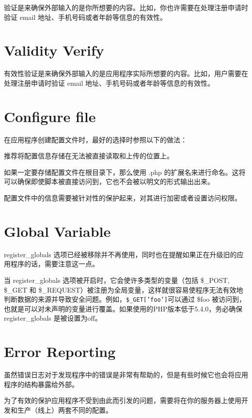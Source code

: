 验证是来确保外部输入的是你所想要的内容。比如，你也许需要在处理注册申请时验证 email 地址、手机号码或者年龄等信息的有效性。


\section{Validity Verify}


有效性验证是来确保外部输入的是应用程序实际所想要的内容。比如，用户需要在处理注册申请时验证 email 地址、手机号码或者年龄等信息的有效性。

\section{Configure file}

在应用程序创建配置文件时，最好的选择时参照以下的做法：

\begin{compactitem}
\item 推荐将配置信息存储在无法被直接读取和上传的位置上。
\item 如果一定要存储配置文件在根目录下，那么使用 .php 的扩展名来进行命名。这将可以确保即使脚本被直接访问到，它也不会被以明文的形式输出出来。
\item 配置文件中的信息需要被针对性的保护起来，对其进行加密或者设置访问权限。
\end{compactitem}

\section{Global Variable}

register\_globals 选项已经被移除并不再使用，同时也在提醒如果正在升级旧的应用程序的话，需要注意这一点。

当 register\_globals 选项被开启时，它会使许多类型的变量（包括 \$\_POST, \$\_GET 和 \$\_REQUEST）被注册为全局变量，这样就很容易使程序无法有效地判断数据的来源并导致安全问题。例如，\texttt{\$\_GET['foo']}可以通过 \$foo 被访问到，也就是可以对未声明的变量进行覆盖。如果使用的PHP版本低于5.4.0，务必确保 register\_globals 是被设置为off。


\section{Error Reporting}

虽然错误日志对于发现程序中的错误是非常有帮助的，但是有些时候它也会将应用程序的结构暴露给外部。

为了有效的保护应用程序不受到由此而引发的问题，需要将在你的服务器上使用开发和生产（线上）两套不同的配置。

